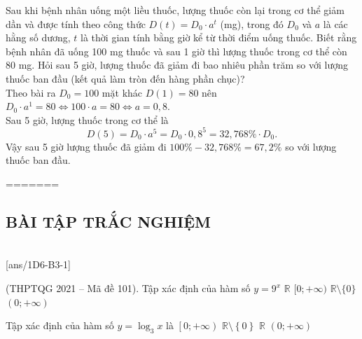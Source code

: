\begin{ex}%
	Sau khi bệnh nhân uống một liều thuốc, lượng thuốc còn lại trong cơ thể giảm dần và được tính theo công thức $D(t)=D_0\cdot a^t$ (mg), trong đó $D_0$ và $a$ là các hằng số dương, $t$ là thời gian tính bằng giờ kể từ thời điểm uống thuốc. Biết rằng bệnh nhân đã uống 100 mg thuốc và sau 1 giờ thì lượng thuốc trong cơ thể còn 80 mg. Hỏi sau 5 giờ, lượng thuốc đã giảm đi bao nhiêu phần trăm so với lượng thuốc ban đầu (kết quả làm tròn đến hàng phần chục)?\\
	\loigiai
	{Theo bài ra $D_0=100$ mặt khác $D(1)=80$ nên $D_0\cdot a^1=80\Leftrightarrow 100\cdot a=80\Leftrightarrow a=0{,}8$.\\
		Sau 5 giờ, lượng thuốc trong cơ thể là 
		\[D(5)=D_0\cdot a^5=D_0\cdot 0{,}8^5=32{,}768\%\cdot D_0.\]
		Vậy sau 5 giờ lượng thuốc đã giảm đi $100\%-32{,}768\%=67{,}2\%$ so với lượng thuốc ban đầu. 
	}
\end{ex}

=======
\subsection{BÀI TẬP TRẮC NGHIỆM}
 \\
\setcounter{ex}{0}
[ans/1D6-B3-1]
\begin{ex}
	(THPTQG 2021 -- Mã đề 101). Tập xác định của hàm số $y=9^x$
	\choice
	{\True $\mathbb R$}
	{$[0;+\infty)$}
	{$\mathbb R\setminus\{0\}$}
	{$(0;+\infty)$}
\end{ex}
\begin{ex}
	Tập xác định của hàm số $y=\log_3{x}$ là
	\choice
	{$\left[0;+\infty \right)$}
	{$\mathbb{R}\setminus {\left\lbrace 0\right\rbrace}$}
	{$\mathbb{R}$}
	{\True $\left(0;+\infty \right)$}
\end{ex}

